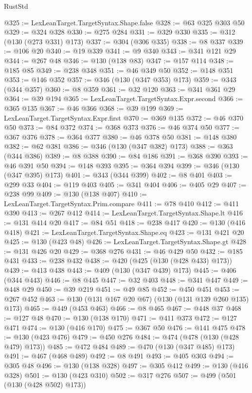 \begin{lexlean}{RustStd}
\begin{coremodule}
@325 := LexLeanTarget.TargetSyntax.Shape.false
@328 := @63 @325 @303 @50
@329 := @324 @328
@330 := @275 @284
@331 := @329 @330
@335 := @312 (@130 (@273 @331) @173)
@337 := @304 (@306 @335)
@338 := @8 @337
@339 := @106 @20
@340 := @19 @339
@341 := @9 @340
@343 := @341 @121 @29
@344 := @267 @48
@346 := @130 (@138 @83)
@347 := @157 @114
@348 := @185 @85
@349 := @238 @348
@351 := @46 @349 @50
@352 := @148 @351
@353 := @146 @352
@357 := @346 (@130 (@347 @353) @173)
@359 := @343 (@344 @357)
@360 := @8 @359
@361 := @32 @120
@363 := @341 @361 @29
@364 := @39 @194
@365 := LexLeanTarget.TargetSyntax.Expr.second
@366 := @365 @135
@367 := @46 @366
@368 := @39 @199
@369 := LexLeanTarget.TargetSyntax.Expr.first
@370 := @369 @135
@372 := @46 @370 @50
@373 := @84 @372
@374 := @368 @373
@376 := @46 @374 @50
@377 := @367 @376
@378 := @364 @377
@380 := @46 @378 @50
@381 := @148 @380
@382 := @62 @381
@386 := @346 (@130 (@347 @382) @173)
@388 := @363 (@344 @386)
@389 := @8 @388
@390 := @84 @186
@391 := @368 @390
@393 := @46 @391 @50
@394 := @148 @393
@395 := @364 @394
@399 := @346 (@130 (@347 @395) @173)
@401 := @343 (@344 @399)
@402 := @8 @401
@403 := @299 @33
@404 := @119 @403
@405 := @341 @404
@406 := @405 @29
@407 := @238 @99
@409 := @130 (@138 @407)
@410 := LexLeanTarget.TargetSyntax.Prim.compare
@411 := @78 @410
@412 := @411 @390
@413 := @267 @412
@414 := LexLeanTarget.TargetSyntax.Shape.lt
@416 := @131 @414 @20
@417 := @84 @51
@418 := @238 @417
@420 := @130 (@416 @418)
@421 := LexLeanTarget.TargetSyntax.Shape.eq
@423 := @131 @421 @20
@425 := @130 (@423 @48)
@426 := LexLeanTarget.TargetSyntax.Shape.gt
@428 := @131 @426 @20
@429 := @368 @276
@431 := @46 @429 @50
@432 := @185 @431
@433 := @238 @432
@438 := @420 (@425 (@130 (@428 @433) @173))
@439 := @413 @438
@443 := @409 (@130 (@347 @439) @173)
@445 := @406 (@344 @443)
@446 := @8 @445
@447 := @32 @403
@448 := @341 @447
@449 := @448 @29
@450 := @39 @219
@451 := @49 @85
@452 := @450 @451
@453 := @267 @452
@463 := @130 (@131 @167 @20 @67) (@130 (@131 @139 @260 @135) @173)
@465 := @449 (@453 @463)
@466 := @8 @465
@467 := @448 @37
@468 := @127 @48
@470 := @130 (@138 @170)
@471 := @411 @373
@472 := @127 @471
@474 := @130 (@416 @170)
@475 := @367 @50
@476 := @141 @475
@478 := @130 (@423 @476)
@479 := @450 @276
@484 := @474 (@478 (@130 (@428 @479) @173))
@485 := @472 @484
@489 := @470 (@130 (@347 @485) @173)
@491 := @467 (@468 @489)
@492 := @8 @491
@493 := @405 @303
@494 := @305 @48
@496 := @130 (@138 @328)
@497 := @305 @412
@499 := @130 (@416 @328)
@501 := @130 (@423 @310)
@502 := @317 @276
@507 := @499 (@501 (@130 (@428 @502) @173))

\end{coremodule}
\end{lexlean}
